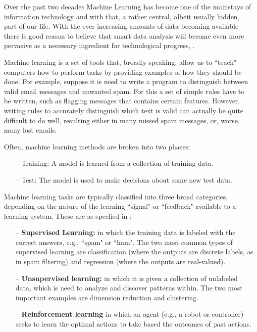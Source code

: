 Over the past two decades Machine Learning has become one of the mainstays of information technology and with that, a rather central, albeit usually hidden, part of our life. With the ever increasing amounts of data becoming available there is good reason to believe that smart data analysis will become even more pervasive as a necessary ingredient for technological progress, \cite{machinelearningdef}. 

Machine learning is a set of tools that, broadly speaking, allow us to ``teach" computers how to perform tasks by providing examples of how they should be done. For example, suppose it is need to write a program to distinguish between valid email messages and unwanted spam. For this a set of simple rules have to be written, such as flagging messages that contains certain features. However, writing rules to accurately distinguish which text is valid can actually be quite difficult to do well, resulting either in many missed spam messages, or, worse, many lost emails.

Often, machine learning methods are broken into two phases:
\begin{enumerate}
\item[--] Training: A model is learned from a collection of training data.
\item[--] Test: The model is used to make decisions about some new test data.
\end{enumerate}

Machine learning tasks are typically classified into three broad categories, depending on the nature of the learning ``signal" or ``feedback" available to a learning system. These are as specfied in \cite{machinetypes}:

\begin{itemize}

\item[--] \textbf{Supervised Learning:} in which the training data is labeled with the correct answers, e.g., ``spam" or ``ham". The two most common types of supervised learning are classification (where the outputs are discrete labels, as in spam filtering) and regression (where the outputs are real-valued).
\item[--] \textbf{Unsupervised learning:} in which it is given a collection of unlabeled data, which is need to analyze and discover patterns within. The two most important examples are dimension reduction and clustering.
\item[--] \textbf{Reinforcement learning} in which an agent (e.g., a robot or controller) seeks to learn the optimal actions to take based the outcomes of past actions.
\end{itemize}


